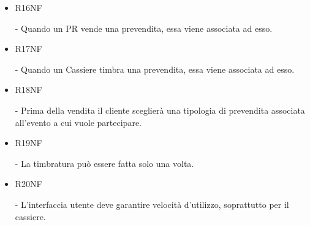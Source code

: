 \documentclass[a4paper]{article}
\begin{document}
\begin{itemize}
	\item \hypertarget{R16NF}{R16NF} - Quando un PR vende una prevendita, essa viene associata ad esso.
	\item \hypertarget{R17NF}{R17NF} - Quando un Cassiere timbra una prevendita, essa viene associata ad esso.
	
	\item \hypertarget{R18NF}{R18NF} - Prima della vendita il cliente sceglierà una tipologia di prevendita associata all'evento a cui vuole partecipare.
	
	\item \hypertarget{R19NF}{R19NF} - La timbratura può essere fatta solo una volta.
	
	\item \hypertarget{R20NF}{R20NF} - L'interfaccia utente deve garantire velocità d'utilizzo, soprattutto per il cassiere.
	
	
	
	
	
	
	
	
	
\end{itemize}
\end{document}
